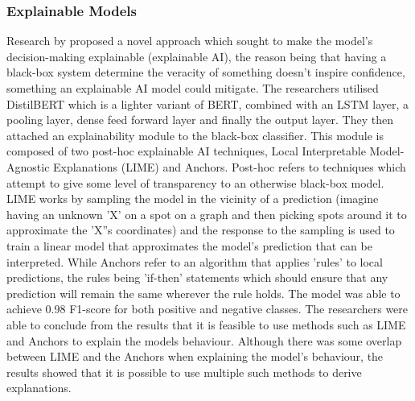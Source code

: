 \documentclass[stu,12pt,floatsintext,donotrepeattitle]{apa7}
\begin{document}
\subsubsection{Explainable Models}
Research by \textcite{xai-bert} proposed a novel approach which sought to make the model's decision-making explainable (explainable AI), the reason being that having a black-box system determine the veracity of something doesn't inspire confidence, something an explainable AI model could mitigate. The researchers utilised DistilBERT which is a lighter variant of BERT, combined with an LSTM layer, a pooling layer, dense feed forward layer and finally the output layer. They then attached an explainability module to the black-box classifier. This module is composed of two post-hoc explainable AI techniques, Local Interpretable Model-Agnostic Explanations (LIME) and Anchors. Post-hoc refers to techniques which attempt to give some level of transparency to an otherwise black-box model. LIME works by sampling the model in the vicinity of a prediction (imagine having an unknown 'X' on a spot on a graph and then picking spots around it to approximate the 'X''s coordinates) and the response to the sampling is used to train a linear model that approximates the model's prediction that can be interpreted. While Anchors refer to an algorithm that applies 'rules' to local predictions, the rules being 'if-then' statements which should ensure that any prediction will remain the same wherever the rule holds. The model was able to achieve 0.98 F1-score for both positive and negative classes. The researchers were able to conclude from the results that it is feasible to use methods such as LIME and Anchors to explain the models behaviour. Although there was some overlap between LIME and the Anchors when explaining the model's behaviour, the results showed that it is possible to use multiple such methods to derive explanations. 
\end{document}
